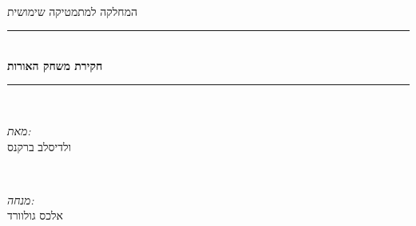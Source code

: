 \documentclass[12pt,twoside]{article}
\begin{document}
\begin{titlepage}
	
\newcommand{\HRule}{\rule{\linewidth}{0.5mm}} %

\center %


\textsc{\LARGE   
}\\[1.5cm]
\textsc{\LARGE 
המחלקה למתמטיקה שימושית
}\\[0.5cm]


\HRule \\[0.4cm]
{ \huge \bfseries
חקירת משחק האורות
 }\\[0.4cm] 
\HRule \\[1.5cm]


\begin{minipage}{0.4\textwidth}
\begin{flushleft} \large
\emph{מאת:}\\
ולדיסלב ברקנס
\end{flushleft}
\end{minipage}
~
\begin{minipage}{0.4\textwidth}
\begin{flushright} \large
\emph{מנחה:} \\
אלכס גולוורד 
\end{flushright}
\end{minipage}\\[2cm]


\end{titlepage}
\end{document}
